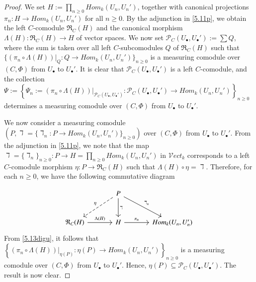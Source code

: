 \documentclass[10pt, colorlinks]{article}
\numberwithin{equation}{section} \DeclareMathSizes{2}{10}{12}{13}
\begin{document}
\begin{proof}
      We set $H:=\underset{n\geq 0}{\prod}{Hom}_k(U_n,U_n')$, together with canonical projections $\pi_n:H\longrightarrow  {Hom}_k(U_n,U_n')$ for all $n\geq 0$. By the adjunction in \eqref{5.11p}, we obtain the left $C$-comodule $\mathfrak R_C(H)$ and the canonical morphism $\Lambda(H):\mathfrak R_C(H)\longrightarrow  H$ of vector spaces. We now set $\mathcal P_C(U_\bullet, U_\bullet'):=\sum Q$, where the sum is taken over all left $C$-subcomodules $Q$ of $\mathfrak R_C(H)$ such that $\Big\{(\pi_n\circ\Lambda(H))\big|_{Q}:Q\longrightarrow Hom_k(U_n,U_n')\Big\}_{n\geq 0}$ is a measuring comodule over $(C,\Phi)$ from $U_\bullet$ to $U_\bullet'$. It is  clear that $\mathcal P_C(U_\bullet, U_\bullet')$ is a left $C$-comodule, and the collection $\Psi:=\left\{\Psi_n:=(\pi_n\circ\Lambda(H))\big|_{\mathcal P_C(U_\bullet, U_\bullet')}:\mathcal P_C(U_\bullet, U_\bullet')\longrightarrow  {Hom}_k(U_n,U_n')\right\}_{n\geq 0}$ determines a measuring comodule over $(C,\Phi)$ from $U_\bullet$ to $U_\bullet'$.
      \smallskip 
      
      We now consider a measuring comodule $(P,\daleth=\{\daleth_n: P\longrightarrow Hom_k(U_n, U_n')\}_{n\geq 0})$ over $(C,\Phi)$ from $U_\bullet$ to $U_\bullet'$. From the adjunction in \eqref{5.11p}, we note that the map $\daleth=\{\daleth_n\}_{n\geq 0}:P\longrightarrow   H=\underset{n\geq 0}{\prod}Hom_k(U_n,U_n')$ in $ \mathcal Vect_k$ corresponds to a left $C$-comodule morphism $\eta: P\longrightarrow \mathfrak R_C(H)$ such that $\Lambda(H)\circ \eta=\daleth$. Therefore, for each $n\geq 0$, we have the following commutative diagram 

          \begin{equation}\label{5.13digu}
        \begin{array}{c}
\begin{tikzcd}[column sep=large, row sep=large]
& P \arrow[dl, dashed, "\eta"'] 
    \arrow[d, "\daleth"] 
    \arrow[dr, "{\daleth_n}"] & \\
\mathfrak R_C(H) \arrow[r, "\Lambda(H)"] 
& H \arrow[r, "\pi_n"] 
& { {Hom}}_k(U_n,U_n')
\end{tikzcd}
\end{array}
\end{equation}
    From \eqref{5.13digu},  it follows  that $\left\{(\pi_n\circ\Lambda(H))\big|_{\eta(P)}:\eta(P)\longrightarrow Hom_k(U_n,U_n')\right\}_{n\geq 0}$ is a measuring comodule over $(C,\Phi)$ from $U_\bullet$ to $U_\bullet'$. Hence, $\eta(P)\subseteq \mathcal P_C(U_\bullet,U_\bullet')$. The result is now clear.
\end{proof}
\end{document}
